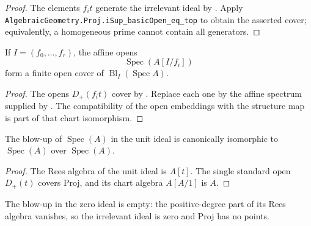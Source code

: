 \begin{proof}
  The elements $f_it$ generate the irrelevant ideal by
  .  Apply
  \texttt{AlgebraicGeometry.Proj.iSup\_basicOpen\_eq\_top} to obtain the
  asserted cover; equivalently, a homogeneous prime cannot contain all
  generators.
\end{proof}

\begin{proposition}
  \label{prop:nagata-affine-blowup-chart-cover}

  If $I=(f_0,\ldots,f_r)$, the affine opens
  \[
    \operatorname{Spec}(A[I/f_i])
  \]
  form a finite open cover of
  $\operatorname{Bl}_I(\operatorname{Spec}A)$.
\end{proposition}

\begin{proof}
  The opens $D_+(f_it)$ cover by
  .  Replace each one by the
  affine spectrum supplied by .  The
  compatibility of the open embeddings with the structure map is part of that
  chart isomorphism.
\end{proof}

\begin{lemma}
  \label{lemma:nagata-affine-blowup-top}

  The blow-up of $\operatorname{Spec}(A)$ in the unit ideal is canonically
  isomorphic to $\operatorname{Spec}(A)$ over $\operatorname{Spec}(A)$.
\end{lemma}

\begin{proof}
  The Rees algebra of the unit ideal is $A[t]$.  The single standard open
  $D_+(t)$ covers Proj, and its chart algebra $A[A/1]$ is $A$.
\end{proof}

\begin{lemma}
  \label{lemma:nagata-affine-blowup-bot}

  The blow-up in the zero ideal is empty: the positive-degree part of its Rees
  algebra vanishes, so the irrelevant ideal is zero and Proj has no points.
\end{lemma}


